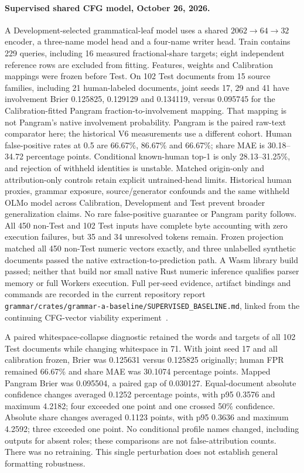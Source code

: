 \paragraph{Supervised shared CFG model, October 26, 2026.}
A Development-selected grammatical-leaf model uses a shared
$2062\!\to\!64\!\to\!32$ encoder, a three-name model head and a four-name writer head.
Train contains 229 queries, including 16 measured fractional-share targets;
eight independent reference rows are excluded from fitting. Features, weights
and Calibration mappings were frozen before Test. On 102 Test documents from
15 source families, including 21 human-labeled documents, joint seeds 17, 29
and 41 have involvement Brier 0.125825, 0.129129 and 0.134119, versus 0.095745
for the Calibration-fitted Pangram fraction-to-involvement mapping. That mapping
is not Pangram's native involvement probability. Pangram is the paired raw-text
comparator here; the historical V6 measurements use a different cohort.
Human false-positive rates at
0.5 are 66.67\%, 86.67\% and 66.67\%; share MAE is 30.18--34.72 percentage points.
Conditional known-human top-1 is only 28.13--31.25\%, and rejection of withheld
identities is unstable. Matched origin-only and attribution-only controls retain
explicit untrained-head limits. Historical human proxies, grammar exposure,
source/generator confounds and the same withheld OLMo model across Calibration,
Development and Test prevent broader generalization claims. No rare
false-positive guarantee or Pangram parity follows. All 450 non-Test and 102
Test inputs have complete byte accounting with zero execution failures, but
35 and 34 unresolved tokens remain. Frozen projection matched all 450 non-Test
numeric vectors exactly, and three unlabelled synthetic documents passed the
native extraction-to-prediction path. A Wasm library build passed; neither that
build nor small native Rust numeric inference qualifies parser memory or full
Workers execution. Full per-seed evidence,
artifact bindings and commands are recorded in the current repository report
\texttt{grammar/crates/grammar-a-baseline/}\allowbreak\texttt{SUPERVISED\_BASELINE.md},
linked from the continuing CFG-vector viability experiment~\cite{cfgvectorprep}.

A paired whitespace-collapse diagnostic retained the words and targets of all
102 Test documents while changing whitespace in 71. With joint seed 17 and all
calibration frozen, Brier was 0.125631 versus 0.125825 originally; human FPR
remained 66.67\% and share MAE was 30.1074 percentage points. Mapped Pangram Brier
was 0.095504, a paired gap of 0.030127. Equal-document absolute confidence changes
averaged 0.1252 percentage points, with p95 0.3576 and maximum 4.2182; four exceeded
one point and one crossed 50\% confidence. Absolute share changes averaged
0.1123 points, with p95 0.3636 and maximum 4.2592; three exceeded one point.
No conditional profile names changed, including outputs for absent roles;
these comparisons are not false-attribution counts. There was no retraining.
This single perturbation does not establish general formatting robustness.

